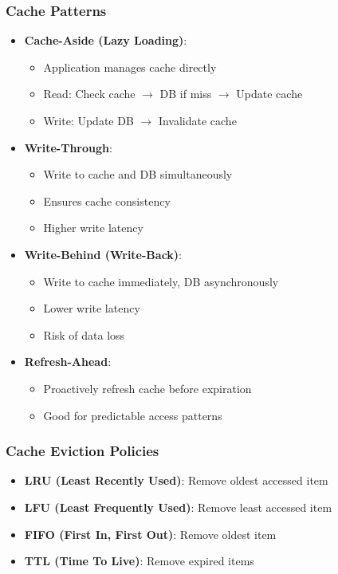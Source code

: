 \documentclass[10pt,a4paper]{article}
\begin{document}
\subsubsection{Cache Patterns}
\begin{itemize}
\item \textbf{Cache-Aside (Lazy Loading)}:
  \begin{itemize}
  \item Application manages cache directly
  \item Read: Check cache $\rightarrow$ DB if miss $\rightarrow$ Update cache
  \item Write: Update DB $\rightarrow$ Invalidate cache
  \end{itemize}
\item \textbf{Write-Through}:
  \begin{itemize}
  \item Write to cache and DB simultaneously
  \item Ensures cache consistency
  \item Higher write latency
  \end{itemize}
\item \textbf{Write-Behind (Write-Back)}:
  \begin{itemize}
  \item Write to cache immediately, DB asynchronously
  \item Lower write latency
  \item Risk of data loss
  \end{itemize}
\item \textbf{Refresh-Ahead}:
  \begin{itemize}
  \item Proactively refresh cache before expiration
  \item Good for predictable access patterns
  \end{itemize}
\end{itemize}

\subsubsection{Cache Eviction Policies}
\begin{itemize}
\item \textbf{LRU (Least Recently Used)}: Remove oldest accessed item
\item \textbf{LFU (Least Frequently Used)}: Remove least accessed item
\item \textbf{FIFO (First In, First Out)}: Remove oldest item
\item \textbf{TTL (Time To Live)}: Remove expired items
\end{itemize}
\end{document}
